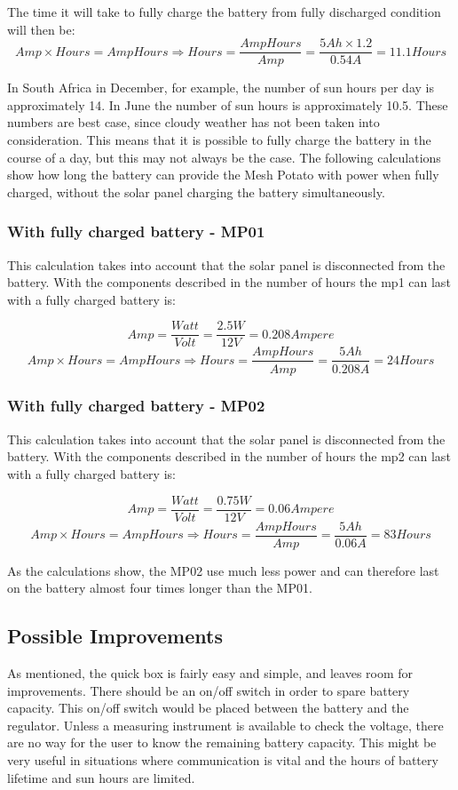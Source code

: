 The time it will take to fully charge the battery from fully discharged condition will then be: 
$$Amp\times Hours = AmpHours \Rightarrow Hours =\frac{AmpHours}{Amp} = \frac{5 Ah\times 1.2}{0.54A} = 11.1 Hours$$

In South Africa in December, for example, the number of sun hours per day is approximately 14. In June the number of sun hours is approximately 10.5. These numbers are best case, since cloudy weather has not been taken into consideration. This means that it is possible to fully charge the battery in the course of a day, but this may not always be the case. The following calculations show how long the battery can provide the Mesh Potato with power when fully charged, without the solar panel charging the battery simultaneously. 

\subsubsection{With fully charged battery - MP01}
This calculation takes into account that the solar panel is disconnected from the battery. With the components described in  the number of hours the \gls{mp1} can last with a fully charged battery is: 

$$Amp = \frac{Watt}{Volt} = \frac{2.5 W}{12 V} = 0.208 Ampere$$
$$Amp\times Hours = AmpHours \Rightarrow Hours = \frac{AmpHours}{Amp} = \frac{5 Ah}{0.208 A} = 24 Hours$$

\subsubsection{With fully charged battery - MP02}
This calculation takes into account that the solar panel is disconnected from the battery. With the components described in  the number of hours the \gls{mp2} can last with a fully charged battery is: 

$$Amp = \frac{Watt}{Volt} = \frac{0.75 W}{12 V} = 0.06 Ampere$$
$$Amp\times Hours = AmpHours \Rightarrow Hours = \frac{AmpHours}{Amp} = \frac{5 Ah}{0.06 A} = 83 Hours$$

As the calculations show, the MP02 use much less power and can therefore last on the battery almost four times longer than the MP01. 


\subsection{Possible Improvements}
As mentioned, the \gls {quick} box is fairly easy and simple, and leaves room for improvements. There should be an on/off switch in order to spare battery capacity. This on/off switch would be placed between the battery and the regulator. Unless a measuring instrument is available to check the voltage, there are no way for the user to know the remaining battery capacity. This might be very useful in situations where communication is vital and the hours of battery lifetime and sun hours are limited. 

